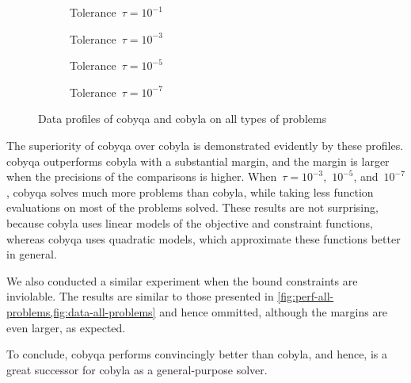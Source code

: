 \begin{figure}[ht]
    \centering
    \begin{subfigure}[b]{0.49\textwidth}
        \centering
        \caption{Tolerance~$\tau = 10^{-1}$}
    \end{subfigure}
    \hfill
    \begin{subfigure}[b]{0.49\textwidth}
        \centering
        \caption{Tolerance~$\tau = 10^{-3}$}
    \end{subfigure}
    \begin{subfigure}[b]{0.49\textwidth}
        \centering
        \caption{Tolerance~$\tau = 10^{-5}$}
    \end{subfigure}
    \hfill
    \begin{subfigure}[b]{0.49\textwidth}
        \centering
        \caption{Tolerance~$\tau = 10^{-7}$}
    \end{subfigure}
    \caption[Data profiles on all problems]{Data profiles of \gls{cobyqa} and \gls{cobyla} on all types of problems}
    \label{fig:data-all-problems}
\end{figure}

The superiority of \gls{cobyqa} over \gls{cobyla} is demonstrated evidently by these profiles.
\Gls{cobyqa} outperforms \gls{cobyla} with a substantial margin, and the margin is larger when the precisions of the comparisons is higher.
When~$\tau = 10^{-3}$,~$10^{-5}$, and~$10^{-7}$, \gls{cobyqa} solves much more problems than \gls{cobyla}, while taking less function evaluations on most of the problems solved.
These results are not surprising, because \gls{cobyla} uses linear models of the objective and constraint functions, whereas \gls{cobyqa} uses quadratic models, which approximate these functions better in general.

We also conducted a similar experiment when the bound constraints are inviolable.
The results are similar to those presented in \cref{fig:perf-all-problems,fig:data-all-problems} and hence ommitted, although the margins are even larger, as expected.

To conclude, \gls{cobyqa} performs convincingly better than \gls{cobyla}, and hence, is a great successor for \gls{cobyla} as a general-purpose solver.

